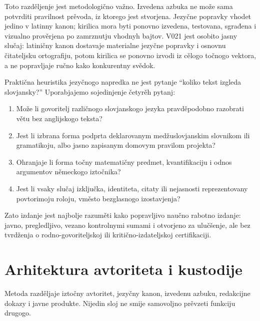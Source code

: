 \documentclass[11pt]{article}
\begin{document}
Toto razděljenje jest metodologično važno. Izvedena azbuka ne može sama potvrditi pravilnost prěvoda, iz ktorego jest stvorjena. Jezyčne popravky vhodet jedino v latinny kanon; kirilica mora byti ponovno izvedena, testovana, sgrađena i vizualno prověrjena po zamrznutju vhodnyh bajtov. V021 jest osobito jasny slučaj: latiničny kanon dostavaje materialne jezyčne popravky i osnovnu čitateljsku ortografiju, potom kirilica se ponovno izvodi iz cělogo točnogo vektora, a ne popravljaje ručno kako konkurentny svědok.

Praktična heuristika jezyčnogo napredka ne jest pytanje ``koliko tekst izgleda slovjansky?'' Uporabjajemo sojedinjenje četyrěh pytanj:

\begin{enumerate}
\item Može li govoritelj različnogo slovjanskogo jezyka pravděpodobno razobrati větu bez anglijskogo teksta?
\item Jest li izbrana forma podprta deklarovanym medžuslovjanskim slovnikom ili gramatikoju, albo jasno zapisanym domovym pravilom projekta?
\item Ohranjaje li forma točny matematičny predmet, kvantifikaciju i odnos argumentov německogo iztočnika?
\item Jest li vsaky slučaj izključka, identiteta, citaty ili nejasnosti reprezentovany povtorimoju roloju, vměsto bezglasnogo izostavjenja?
\end{enumerate}

Zato izdanje jest najbolje razuměti kako popravljivo naučno rabotno izdanje: javno, pregledljivo, vezano kontrolnymi sumami i otvorjeno za ulučšenje, ale bez tvrdženja o rodno-govoriteljskoj ili kritično-izdateljskoj certifikaciji.

\section{Arhitektura avtoriteta i kustodije}

Metoda razděljaje iztočny avtoritet, jezyčny kanon, izvedenu azbuku, redakcijne dokazy i javne produkte. Nijedin sloj ne smije samovoljno prěvzeti funkciju drugogo.
\end{document}
